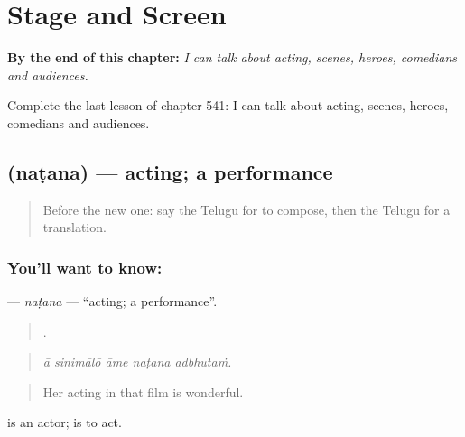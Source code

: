 
\chapter{Stage and Screen}
\label{ch:te-stage-and-screen}

\begin{chapteropening}
\textbf{By the end of this chapter:} \emph{I can talk about acting, scenes, heroes, comedians and audiences.}

Complete the last lesson of chapter 541: I can talk about acting, scenes, heroes, comedians and audiences.
\end{chapteropening}

\section[\texorpdfstring{\te{నటన} (naṭana)}{నటన (naṭana)}]{ (naṭana) — acting; a performance}

\label{lesson:TE-C541-natana}



\begin{quote}
Before the new one: say the Telugu for to compose, then the Telugu for a translation.
\end{quote}

\subsection*{You'll want to know: }
\textbf{} — \emph{naṭana} — \textquotedblleft{}acting; a performance\textquotedblright{}.

\begin{quote}
    .
\end{quote}

\begin{quote}
\emph{ā sinimālō āme naṭana adbhutaṁ.}
\end{quote}

\begin{quote}
Her acting in that film is wonderful.
\end{quote}

 is an actor;  is to act.

